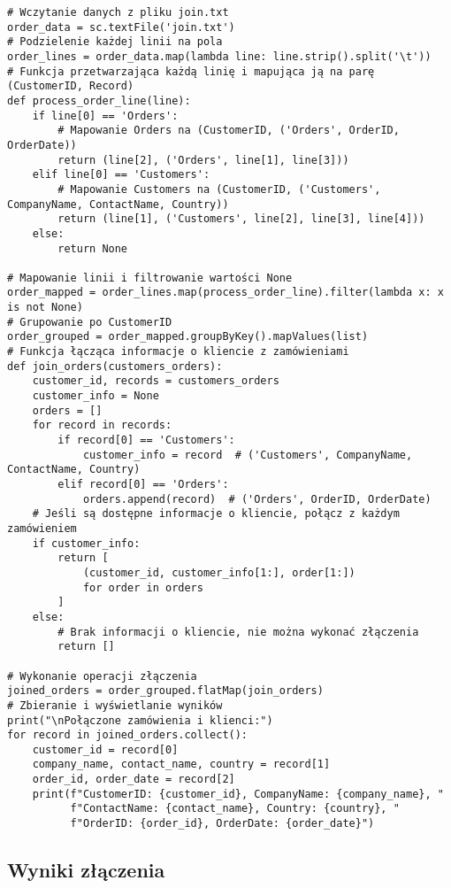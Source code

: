 \documentclass{article}
\begin{document}
\begin{lstlisting}[style=pystyle, caption=Złączenie relacji z pliku \texttt{join.txt}]
# Wczytanie danych z pliku join.txt
order_data = sc.textFile('join.txt')
# Podzielenie każdej linii na pola
order_lines = order_data.map(lambda line: line.strip().split('\t'))
# Funkcja przetwarzająca każdą linię i mapująca ją na parę (CustomerID, Record)
def process_order_line(line):
    if line[0] == 'Orders':
        # Mapowanie Orders na (CustomerID, ('Orders', OrderID, OrderDate))
        return (line[2], ('Orders', line[1], line[3]))
    elif line[0] == 'Customers':
        # Mapowanie Customers na (CustomerID, ('Customers', CompanyName, ContactName, Country))
        return (line[1], ('Customers', line[2], line[3], line[4]))
    else:
        return None

# Mapowanie linii i filtrowanie wartości None
order_mapped = order_lines.map(process_order_line).filter(lambda x: x is not None)
# Grupowanie po CustomerID
order_grouped = order_mapped.groupByKey().mapValues(list)
# Funkcja łącząca informacje o kliencie z zamówieniami
def join_orders(customers_orders):
    customer_id, records = customers_orders
    customer_info = None
    orders = []
    for record in records:
        if record[0] == 'Customers':
            customer_info = record  # ('Customers', CompanyName, ContactName, Country)
        elif record[0] == 'Orders':
            orders.append(record)  # ('Orders', OrderID, OrderDate)
    # Jeśli są dostępne informacje o kliencie, połącz z każdym zamówieniem
    if customer_info:
        return [
            (customer_id, customer_info[1:], order[1:])
            for order in orders
        ]
    else:
        # Brak informacji o kliencie, nie można wykonać złączenia
        return []

# Wykonanie operacji złączenia
joined_orders = order_grouped.flatMap(join_orders)
# Zbieranie i wyświetlanie wyników
print("\nPołączone zamówienia i klienci:")
for record in joined_orders.collect():
    customer_id = record[0]
    company_name, contact_name, country = record[1]
    order_id, order_date = record[2]
    print(f"CustomerID: {customer_id}, CompanyName: {company_name}, "
          f"ContactName: {contact_name}, Country: {country}, "
          f"OrderID: {order_id}, OrderDate: {order_date}")
\end{lstlisting}

\subsection{Wyniki złączenia}
\end{document}
